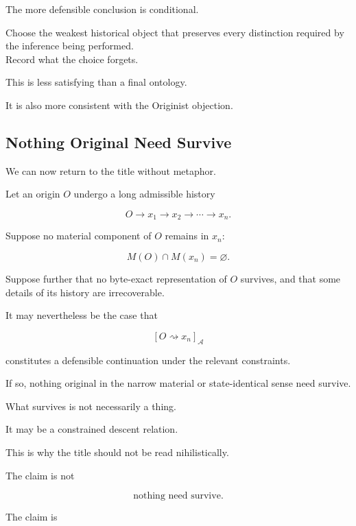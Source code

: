 \documentclass[
  11pt,
  a4paper,
  DIV=12,
  BCOR=0mm,
  parskip=half-
]{scrartcl}
\newcommand{\Adm}{\mathcal A}
\newcommand{\leadsto}{\rightsquigarrow}
\theoremstyle{definition}
\theoremstyle{plain}
\theoremstyle{remark}
\begin{document}
The more defensible conclusion is conditional.

\begin{held}
\centering
Choose the weakest historical object that preserves every distinction required
by the inference being performed.\\[3pt]
Record what the choice forgets.
\end{held}

This is less satisfying than a final ontology.

It is also more consistent with the Originist objection.


\subsection{Nothing Original Need Survive}
\label{sec:nothing-original}

We can now return to the title without metaphor.

Let an origin \(O\) undergo a long admissible history

\[
  O
  \to
  x_1
  \to
  x_2
  \to
  \cdots
  \to
  x_n.
\]

Suppose no material component of \(O\) remains in \(x_n\):

\[
  M(O)\cap M(x_n)=\varnothing.
\]

Suppose further that no byte-exact representation of \(O\) survives, and that
some details of its history are irrecoverable.

It may nevertheless be the case that

\[
  [O\leadsto x_n]_{\Adm}
\]

constitutes a defensible continuation under the relevant constraints.

If so, nothing original in the narrow material or state-identical sense need
survive.

What survives is not necessarily a thing.

It may be a constrained descent relation.

This is why the title should not be read nihilistically.

The claim is not

\[
  \text{nothing need survive}.
\]

The claim is
\end{document}
